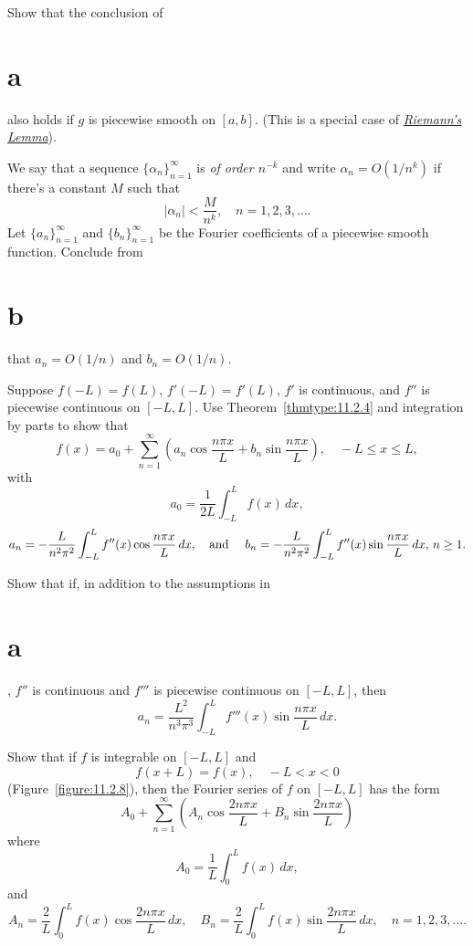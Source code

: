 \begin{exerciselist}
\begin{alist}
    \item %
    Show that the conclusion of \part{a} also holds if $g$ is piecewise smooth on $[a,b]$. (This is
    a special case of
    \href{https://mathshistory.st-andrews.ac.uk/Biographies/Riemann/}{\color{blue}
    \it Riemann's Lemma}).

    \item %
    We say that a sequence $\{\alpha_{n}\}_{n=1}^{\infty}$ is {\color{blue}\it of order $n^{-k}$\/}
    and write $\alpha_{n}=O(1/n^{k})$ if there's a constant $M$ such that
    \[
      |\alpha_{n}|<\frac{M}{n^{k}},\quad n=1,2,3,\dots.
    \]
    Let $\{a_{n}\}_{n=1}^{\infty}$ and $\{b_{n}\}_{n=1}^{\infty}$ be the Fourier coefficients of a
    piecewise smooth function. Conclude from \part{b} that $a_{n}=O(1/n)$ and $b_{n}=O(1/n)$.
  \end{alist}

  \item\label{exer:11.2.26}
  \begin{alist}
    \item %
    Suppose $f(-L)=f(L)$, $f'(-L)=f'(L)$, $f'$ is continuous, and $f''$ is piecewise continuous on
    $[-L,L]$. Use Theorem~\ref{thmtype:11.2.4} and integration by parts to show that
    \[
      f(x)=a_{0}+\sum_{n=1}^{\infty}\left(a_{n}\cos\frac{n\pi x}{L}+b_{n}\sin\frac{n\pi x}{L}\right),\quad-L\le x\le L,
    \]
    with
    \[
      a_{0}=\frac{1}{2L}\int_{-L}^{L}f(x)\,dx,
    \]
    \[
      a_{n}=-\frac{L}{n^{2}\pi^{2}}\int_{-L}^{L}f''(x)\cos\frac{n\pi x}{L}\,dx,\mbox{\quad and \quad}b_{n}=-\frac{L}{n^{2}\pi^{2}}\int_{-L}^{L}f''(x)\sin\frac{n\pi x}{L}\,dx,\,n\ge1.
    \]

    \item %
    Show that if, in addition to the assumptions in \part{a}, $f''$ is continuous and $f'''$ is
    piecewise continuous on $[-L,L]$, then
    \[
      a_{n}=\frac{L^{2}}{n^{3}\pi^{3}}\int_{-L}^{L}f'''(x)\sin\frac{n\pi x}{L}\,dx.
    \]
  \end{alist}

  \item\label{exer:11.2.27} Show that if $f$ is integrable on $[-L,L]$ and
  \[
    f(x+L)=f(x),\quad-L<x<0
  \]
  (Figure~\ref{figure:11.2.8}), then the Fourier series of $f$ on $[-L,L]$ has the form
  \[
    A_{0}+\sum_{n=1}^{\infty}\left(A_{n}\cos\frac{2n\pi x}{L}+B_{n}\sin\frac{2n\pi x}{L}\right)
  \]
  where
  \[
    A_{0}=\frac{1}{L}\int_{0}^{L}f(x)\,dx,
  \]
  and
  \[
    A_{n}=\frac{2}{L}\int_{0}^{L}f(x)\cos\frac{2n\pi x}{L}\,dx,\quad B_{n}=\frac{2}{L}\int_{0}^{L}f(x)\sin\frac{2n\pi x}{L}\,dx,\quad n=1,2,3,\dots.
  \]


\end{exerciselist}

